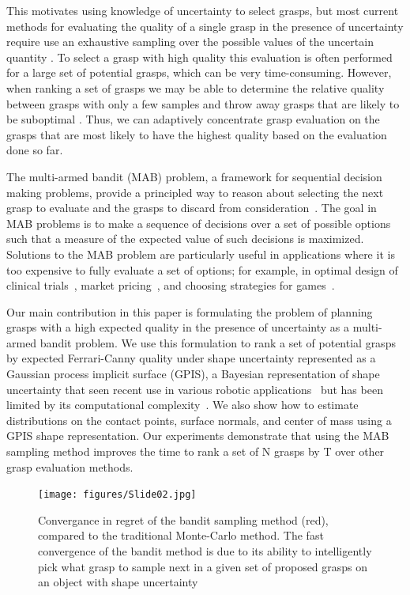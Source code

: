 \documentclass[letterpaper, 10 pt, conference]{ieeeconf}  %
\begin{document}
This motivates using knowledge of uncertainty to select grasps, but most current methods for evaluating the quality of a single grasp in the presence of uncertainty require use an exhaustive sampling over the possible values of the uncertain quantity \cite{kehoe2012toward, kim2012physically, weisz2012pose}.
To select a grasp with high quality this evaluation is often performed for a large set of potential grasps, which can be very time-consuming.
However, when ranking a set of grasps we may be able to determine the relative quality between grasps with only a few samples and throw away grasps that are likely to be suboptimal \cite{kehoe2012estimating}.
Thus, we can adaptively concentrate grasp evaluation on the grasps that are most likely to have the highest quality based on the evaluation done so far.

The multi-armed bandit (MAB) problem, a framework for sequential decision making problems, provide a principled way to reason about selecting the next grasp to evaluate and the grasps to discard from consideration~\cite{barto1998reinforcement, lai1985asymptotically, robbins1952some}.
The goal in MAB problems is to make a sequence of decisions over a set of possible options such that a measure of the expected value of such decisions is maximized.
Solutions to the MAB problem are particularly useful in applications where it is too expensive to fully evaluate a set of options; for example, in optimal design of clinical trials~\cite{simon1989optimal}, market pricing~\cite{rothschild1974two}, and choosing strategies for games~\cite{st2012online}.


Our main contribution in this paper is formulating the problem of planning grasps with a high expected quality in the presence of uncertainty as a multi-armed bandit problem.
We use this formulation to rank a set of potential grasps by expected Ferrari-Canny quality under shape uncertainty represented as a Gaussian process implicit surface (GPIS), a Bayesian representation of shape uncertainty that seen recent use in various robotic applications~\cite{dragiev2011, hollinger2013} but has been limited by its computational complexity~\cite{rasmussen2006, williams2007}.
We also show how to estimate distributions on the contact points, surface normals, and center of mass using a GPIS shape representation.
Our experiments demonstrate that using the MAB sampling method improves the time to rank a set of N grasps by T over other grasp evaluation methods.


\begin{figure}[t!]
\centering
\texttt{[image: figures/Slide02.jpg]}
\caption{\footnotesize
Convergance in regret of the bandit sampling method (red), compared to the traditional Monte-Carlo method. The fast convergence of the bandit method is due to its ability to intelligently pick what grasp to sample next in a given set of proposed grasps on an object with shape uncertainty}
\vspace*{-10pt}
\label{fig:noisy data}
\end{figure}
 
\end{document}
